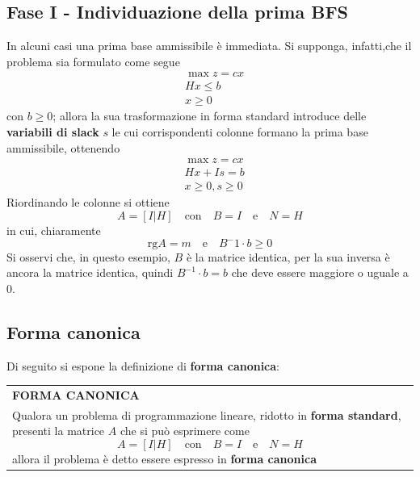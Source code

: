 \documentclass[a4paper]{extarticle}
\renewcommand\arraystretch{}
\begin{document}
\vspace{1em}
\subsection{Fase I - Individuazione della prima BFS}
In alcuni casi una prima base ammissibile è immediata. Si supponga, infatti,che il problema sia formulato come segue
\begin{align*}
    &\max z = cx\\
    &Hx \leq b\\
    &x \geq 0
\end{align*}
con $b \geq 0$; allora la sua trasformazione in forma standard introduce delle \textbf{variabili di slack} $s$ le cui corrispondenti colonne formano la prima base ammissibile, ottenendo
\begin{align*}
    &\max z = cx\\
    &Hx  + Is = b\\
    &x \geq 0, s \geq 0
\end{align*}
Riordinando le colonne si ottiene
\[A=\left[I \vert H\right] \hspace{1em} \text{con} \hspace{1em} B=I \hspace{1em} \text{e} \hspace{1em} N=H\]
in cui, chiaramente
\[\text{rg}{A} = m \hspace{1em} \text{e} \hspace{1em} B{^-1} \cdot b \geq 0\]
Si osservi che, in questo esempio, $B$ è la matrice identica, per la sua inversa è ancora la matrice identica, quindi $B^{-1} \cdot b = b$ che deve essere maggiore o uguale a $0$.

\vspace{1em}
\noindent
\subsection{Forma canonica}
Di seguito si espone la definizione di \textbf{forma canonica}:

\vspace{1em}
\setlength{\tabcolsep}{14pt}
\renewcommand{\arraystretch}{2}
\noindent
\begin{tabularx}{\textwidth}{@{}|P|@{}}
    \hline
    {\textbf{FORMA CANONICA}}\\
    \parbox{\linewidth}{Qualora un problema di programmazione lineare, ridotto in \textbf{forma standard}, presenti la matrice $A$ che si può esprimere come
    \[A=\left[I \vert H\right] \hspace{1em} \text{con} \hspace{1em} B=I \hspace{1em} \text{e} \hspace{1em} N=H\]
    allora il problema è detto essere espresso in \textbf{forma canonica} \vspace{3mm}}\\
    \hline
\end{tabularx}
\end{document}
